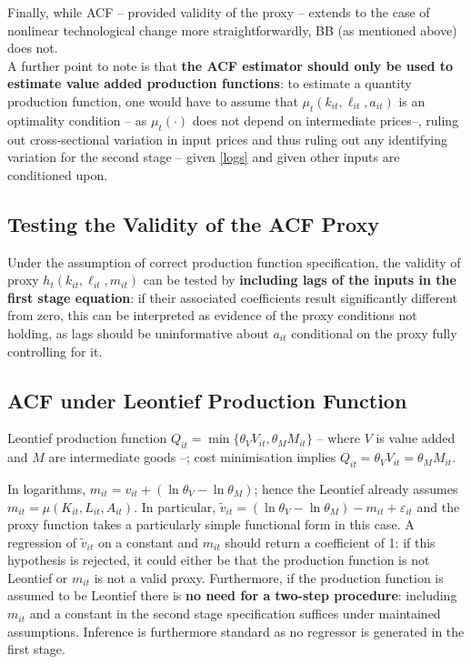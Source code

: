 \documentclass[11pt]{article}
\begin{document}
Finally, while ACF -- provided validity of the proxy -- extends to the case of nonlinear technological change more straightforwardly, BB (as mentioned above) does not. \\

A further point to note is that \textbf{the ACF estimator should only be used to estimate value added production functions}: to estimate a quantity production function, one would have to assume that $\mu_t(k_{it}, \ell_{it}, a_{it})$ is an optimality condition -- as $\mu_t(\cdot)$ does not depend on intermediate prices--, ruling out cross-sectional variation in input prices and thus ruling out any identifying variation for the second stage -- given \eqref{logs} and given other inputs are conditioned upon.

\subsection*{Testing the Validity of the ACF Proxy}

Under the assumption of correct production function specification, the validity of proxy $h_t (k_{it}, \ell_{it}, m_{it})$ can be tested by \textbf{including lags of the inputs in the first stage equation}: if their associated coefficients result significantly different from zero, this can be interpreted as evidence of the proxy conditions not holding, as lags should be uninformative about $a_{it}$ conditional on the proxy fully controlling for it.

\subsection*{ACF under Leontief Production Function}

Leontief production function $Q_{it} = \min\{\theta_V V_{it}, \theta_M M_{it}\}$ -- where $V$ is value added and $M$ are intermediate goods --; cost minimisation implies $Q_{it} = \theta_V V_{it} = \theta_M M_{it}$.

In logarithms, $m_{it} = v_{it} + (\ln \theta_V - \ln \theta_M)$; hence the Leontief already assumes $m_{it} = \mu(K_{it}, L_{it}, A_{it})$.
In particular,  $\tilde{v}_{it} = (\ln \theta_V - \ln \theta_M) - m_{it} + \varepsilon_{it}$ and the proxy function takes a particularly simple functional form in this case.
A regression of $\tilde{v}_{it}$ on a constant and $m_{it}$ should return a coefficient of 1: if this hypothesis is rejected, it could either be that the production function is not Leontief or $m_{it}$ is not a valid proxy.
Furthermore, if the production function is assumed to be Leontief there is \textbf{no need for a two-step procedure}: including $m_{it}$ and a constant in the second stage specification suffices under maintained assumptions.
Inference is furthermore standard as no regressor is generated in the first stage.
\end{document}
